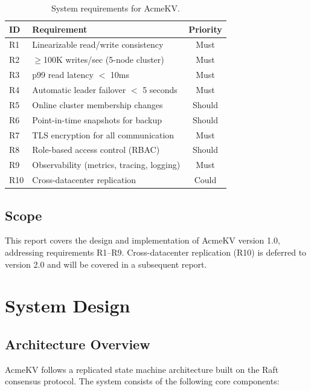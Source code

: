 \documentclass[12pt,a4paper]{report}
\begin{document}
\begin{table}[H]
\centering
\caption{System requirements for AcmeKV.}
\label{tab:requirements}
\begin{tabular}{@{}llc@{}}
\toprule
\textbf{ID} & \textbf{Requirement} & \textbf{Priority} \\
\midrule
R1 & Linearizable read/write consistency & Must \\
R2 & $\geq$100K writes/sec (5-node cluster) & Must \\
R3 & p99 read latency $<$ 10ms & Must \\
R4 & Automatic leader failover $<$ 5 seconds & Must \\
R5 & Online cluster membership changes & Should \\
R6 & Point-in-time snapshots for backup & Should \\
R7 & TLS encryption for all communication & Must \\
R8 & Role-based access control (RBAC) & Should \\
R9 & Observability (metrics, tracing, logging) & Must \\
R10 & Cross-datacenter replication & Could \\
\bottomrule
\end{tabular}
\end{table}

\section{Scope}

This report covers the design and implementation of AcmeKV version 1.0, addressing requirements R1--R9. Cross-datacenter replication (R10) is deferred to version 2.0 and will be covered in a subsequent report.

\chapter{System Design}
\label{ch:design}

\section{Architecture Overview}

AcmeKV follows a replicated state machine architecture built on the Raft consensus protocol. The system consists of the following core components:
\end{document}
